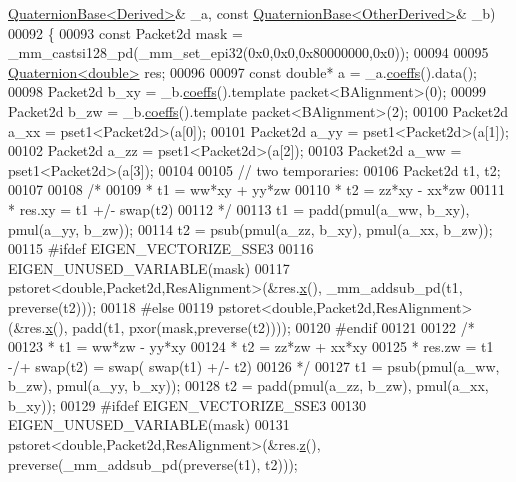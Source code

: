 \begin{DoxyCode}
      \hyperlink{group___geometry___module_class_eigen_1_1_quaternion_base}{QuaternionBase<Derived>}& \_a, \textcolor{keyword}{const} 
      \hyperlink{group___geometry___module_class_eigen_1_1_quaternion_base}{QuaternionBase<OtherDerived>}& \_b)
00092   \{
00093   \textcolor{keyword}{const} Packet2d mask = \_mm\_castsi128\_pd(\_mm\_set\_epi32(0x0,0x0,0x80000000,0x0));
00094 
00095   \hyperlink{group___geometry___module_class_eigen_1_1_quaternion}{Quaternion<double>} res;
00096 
00097   \textcolor{keyword}{const} \textcolor{keywordtype}{double}* a = \_a.\hyperlink{group___geometry___module_aa7bb3fc337ffa82b0ad795783eb8a2ce}{coeffs}().data();
00098   Packet2d b\_xy = \_b.\hyperlink{group___geometry___module_aa7bb3fc337ffa82b0ad795783eb8a2ce}{coeffs}().template packet<BAlignment>(0);
00099   Packet2d b\_zw = \_b.\hyperlink{group___geometry___module_aa7bb3fc337ffa82b0ad795783eb8a2ce}{coeffs}().template packet<BAlignment>(2);
00100   Packet2d a\_xx = pset1<Packet2d>(a[0]);
00101   Packet2d a\_yy = pset1<Packet2d>(a[1]);
00102   Packet2d a\_zz = pset1<Packet2d>(a[2]);
00103   Packet2d a\_ww = pset1<Packet2d>(a[3]);
00104 
00105   \textcolor{comment}{// two temporaries:}
00106   Packet2d t1, t2;
00107 
00108   \textcolor{comment}{/*}
00109 \textcolor{comment}{   * t1 = ww*xy + yy*zw}
00110 \textcolor{comment}{   * t2 = zz*xy - xx*zw}
00111 \textcolor{comment}{   * res.xy = t1 +/- swap(t2)}
00112 \textcolor{comment}{   */}
00113   t1 = padd(pmul(a\_ww, b\_xy), pmul(a\_yy, b\_zw));
00114   t2 = psub(pmul(a\_zz, b\_xy), pmul(a\_xx, b\_zw));
00115 \textcolor{preprocessor}{#ifdef EIGEN\_VECTORIZE\_SSE3}
00116   EIGEN\_UNUSED\_VARIABLE(mask)
00117   pstoret<double,Packet2d,ResAlignment>(&res.\hyperlink{group___geometry___module_a782b9d83caa9bbe84d6e0b822f2dbea9}{x}(), \_mm\_addsub\_pd(t1, preverse(t2)));
00118 \textcolor{preprocessor}{#else}
00119   pstoret<double,Packet2d,ResAlignment>(&res.\hyperlink{group___geometry___module_a782b9d83caa9bbe84d6e0b822f2dbea9}{x}(), padd(t1, pxor(mask,preverse(t2))));
00120 \textcolor{preprocessor}{#endif}
00121   
00122   \textcolor{comment}{/*}
00123 \textcolor{comment}{   * t1 = ww*zw - yy*xy}
00124 \textcolor{comment}{   * t2 = zz*zw + xx*xy}
00125 \textcolor{comment}{   * res.zw = t1 -/+ swap(t2) = swap( swap(t1) +/- t2)}
00126 \textcolor{comment}{   */}
00127   t1 = psub(pmul(a\_ww, b\_zw), pmul(a\_yy, b\_xy));
00128   t2 = padd(pmul(a\_zz, b\_zw), pmul(a\_xx, b\_xy));
00129 \textcolor{preprocessor}{#ifdef EIGEN\_VECTORIZE\_SSE3}
00130   EIGEN\_UNUSED\_VARIABLE(mask)
00131   pstoret<double,Packet2d,ResAlignment>(&res.\hyperlink{group___geometry___module_abb82ebd1b6ac5e6c4442201ede65449b}{z}(), preverse(\_mm\_addsub\_pd(preverse(t1), t2)));

\end{DoxyCode}
